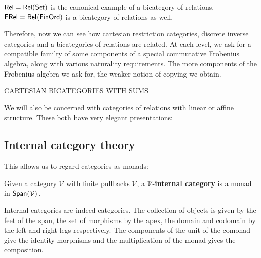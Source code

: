 \begin{example}
$\mathsf{Rel}=\mathsf{Rel}(\mathsf{Set})$ is the canonical example of a bicategory of relations.  $\mathsf{FRel}=\mathsf{Rel}(\mathsf{FinOrd})$ is a bicategory of relations as well.
\end{example}

Therefore, now we can see how cartesian restriction categories,  discrete inverse categories and a bicategories of relations are related.  At each level, we ask for a compatible familty of some components of a special commutative Frobenius algebra, along with various naturality requirements.  The more components of the Frobenius algebra we ask for, the weaker notion of copying we obtain.


CARTESIAN BICATEGORIES WITH SUMS


We will also be concerned with categories of relations with linear or affine structure.  These both have very elegant presentations:




\subsection{Internal category theory}

%
%
%
%
%
%
%




This allows us to regard categories as monads:
\begin{definition}
\label{def:monad}
\end{definition}


\begin{definition}
\label{def:internalcat}

Given a category $\mathcal V$ with finite pullbacks $\mathcal V$, a $\mathcal V$-{\bf internal category} is a monad in $\mathsf{Span}(\mathcal V)$.
\end{definition}

Internal categories are indeed categories.  The collection of objects is given by the feet of the span, the set of morphisms by the apex, the domain and codomain by the left and right legs respectively.  The components of the unit of the comonad give the identity morphisms and the multiplication of the monad gives the composition.

